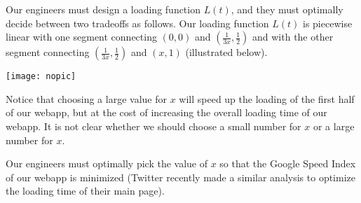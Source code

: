 \documentclass{letter}
\begin{document}
  \begin{problem}{}
    Our engineers must design a loading function $L(t)$, and they must
    optimally decide between two tradeoffs as follows. Our loading
    function $L(t)$ is piecewise linear with one segment connecting
    $(0,0)$ and $\left( \frac{1}{3x}, \frac{1}{2} \right)$ and with the
    other segment connecting $\left( \frac{1}{3x}, \frac{1}{2} \right)$
    and $(x,1)$ (illustrated below).

    \begin{center}
      \texttt{[image: nopic]}
    \end{center}

    Notice that choosing a large value for $x$ will speed up the loading
    of the first half of our webapp, but at the cost of increasing
    the overall loading time of our webapp. It is not clear whether we
    should choose a small number for $x$ or a large number for $x$.

    Our engineers must optimally pick the value of $x$ so that the
    Google Speed Index of our webapp is minimized (Twitter recently
    made a similar analysis to optimize the loading time of their
    main page).


\end{problem}
\end{document}
